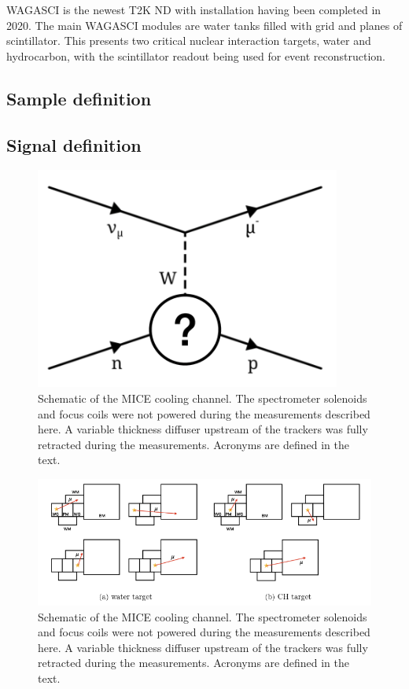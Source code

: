 \documentclass[%
 reprint,
 amsmath,amssymb,
 aps,
]{revtex4-2}
\begin{document}
WAGASCI is the newest T2K ND with installation having been completed in 2020. The main WAGASCI modules are water tanks filled with grid and planes of scintillator. This presents two critical nuclear interaction targets, water and hydrocarbon, with the scintillator readout being used for event reconstruction. 
\subsection{Sample definition}
\label{sec:selection}

\subsection{Signal definition}
\label{sec:seldef}
\begin{figure}[htbp]
\begin{center}
\includegraphics[width=\textwidth]{images/topology}
\end{center}
\caption{Schematic of the MICE cooling channel. The spectrometer solenoids and focus coils were not powered during the measurements described here. A variable thickness diffuser upstream of the trackers was fully retracted during the measurements. Acronyms are defined in the text.}
\label{fig:micecc}
\end{figure}
\begin{figure}[htbp]
\begin{center}
\includegraphics[width=\textwidth]{images/wag_sam}
\end{center}
\caption{Schematic of the MICE cooling channel. The spectrometer solenoids and focus coils were not powered during the measurements described here. A variable thickness diffuser upstream of the trackers was fully retracted during the measurements. Acronyms are defined in the text.}
\label{fig:micecc}
\end{figure}
\end{document}
